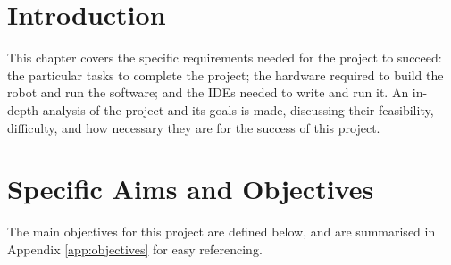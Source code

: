 \documentclass{report}
\begin{document}
    \section{Introduction}
    
    This chapter covers the specific requirements needed for the project to succeed: the particular tasks to complete the project; the hardware required to build the robot and run the software; and the IDEs needed to write and run it. An in-depth analysis of the project and its goals is made, discussing their feasibility, difficulty, and how necessary they are for the success of this project.
    
    \section{Specific Aims and Objectives} \label{sec:objectives}
    
    The main objectives for this project are defined below, and are summarised in Appendix \ref{app:objectives} for easy referencing.
    
\end{document}
